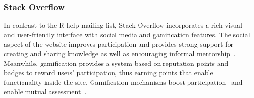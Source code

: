 \subsubsection{Stack Overflow}
\label{subsec:Rtag}

    In contrast to the R-help mailing list, Stack Overflow incorporates a rich visual and user-friendly interface with social media and gamification features.
    The social aspect of the website improves participation and provides strong support for creating and sharing knowledge as well as encouraging informal mentorship~\cite{Jenkins2009, Storey2014}.
    Meanwhile, gamification provides a system based on reputation points and badges to reward users' participation, thus earning points that enable functionality inside the site.
    Gamification mechanisms boost participation~\cite{Vasilescu2014} and enable mutual assessment~\cite{Singer2013}.



